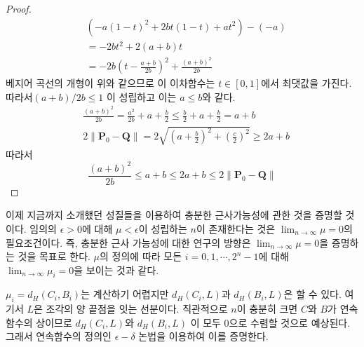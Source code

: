 \documentclass{gshs_thesis}
\theoremstyle{theorem}
\theoremstyle{lemma}
\theoremstyle{definition}
\begin{document}
\begin{proof}
\begin{equation}
\begin{split}
		&(-a(1-t)^{2}+2bt(1-t)+at^{2})-(-a) \\
		&=-2bt^{2}+2(a+b)t  \\
		&=-2b\left(t-\frac{a+b}{2b}\right)^{2}+\frac{(a+b)^{2}}{2b}  
		\end{split}
	\end{equation}
	베지어 곡선의 개형이 위와 같으므로 이 이차함수는 $t\in[0,1]$에서 최댓값을 가진다. 따라서$(a+b)/2b\leq{1}$ 이 성립하고 이는 $a\leq{b}$와 같다.
	\begin{equation}
		\begin{split}
			&\frac{(a+b)^{2}}{2b}=\frac{a^{2}}{2b}+a+\frac{b}{2}\leq\frac{b}{2}+a+\frac{b}{2}=a+b \\
			&2\parallel\textbf{P}_{0}-\textbf{Q}\parallel=2\sqrt{\left(a+\frac{b}{2}\right)^{2}+\left(\frac{c}{2}\right)^{2}}\geq2a+b
		\end{split}
	\end{equation}
	따라서
	\begin{equation}
		\frac{(a+b)^{2}}{2b}\leq{a+b}\leq{2a+b}\leq{2\parallel\textbf{P}_{0}-\textbf{Q}\parallel}
	\end{equation}
\end{proof}
이제 지금까지 소개했던 성질들을 이용하여 충분한 근사가능성에 관한 것을 증명할 것이다.
임의의 $\epsilon>0$에 대해 $\mu<\epsilon$이 성립하는 $n$이 존재한다는 것은 $\lim_{n\to\infty} \mu =0$의 필요조건이다. 즉, 충분한 근사 가능성에 대한 연구의 방향은  $\lim_{n\to\infty} \mu =0$을 증명하는 것을 목표로 한다. $\mu$의 정의에 따라 모든 $i=0,1,\cdots,2^{n}-1$에 대해 $\lim_{n\to\infty} \mu_{i} =0$을 보이는 것과 같다.

 $\mu_{i}=d_{H}(C_{i},B_{i})$는 계산하기 어렵지만 $d_{H}(C_{i},L)$과 $d_{H}(B_{i},L)$은 할 수 있다. 여기서 $L$은 조각의 양 끝점을 잇는 선분이다. 직관적으로 $n$이 충분히 크면 $C$와 $B$가 연속함수의 상이므로 $d_{H}(C_{i},L)$와 $d_{H}(B_{i},L)$ 이 모두 $0$으로 수렴할 것으로 예상된다. 그래서 연속함수의 정의인 $\epsilon-\delta$ 논법을 이용하여 이를 증명한다.
 
\end{document}
